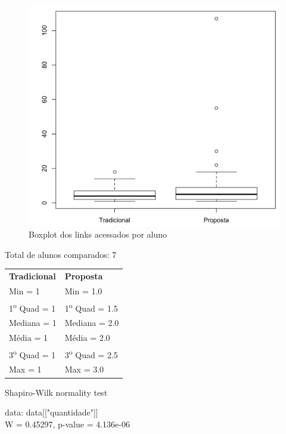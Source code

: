 \begin{figure}[htb]
  \caption{\label{fig:uso-sr-boxplot}Boxplot dos links acessados por aluno}
  \begin{center}
      \includegraphics[scale=0.4]{./Figuras/uso-sr-boxplot.png}
  \end{center}
\end{figure}

\noindent
Total de alunos comparados: 7

\begin{table}[h]
\begin{tabular}{p{}p{}}
\textbf{Tradicional} & \textbf{Proposta}\\
Min = 1 & Min = 1.0\\
1\textsuperscript{o} Quad = 1 & 1\textsuperscript{o} Quad = 1.5\\
Mediana = 1 & Mediana = 2.0\\
Média = 1 & Média = 2.0\\
3\textsuperscript{o} Quad = 1 & 3\textsuperscript{o} Quad = 2.5\\
Max = 1 & Max = 3.0\\
\end{tabular}
\end{table}

  Shapiro-Wilk normality test

\noindent
data:  data[["quantidade"]]\\
W = 0.45297, p-value = 4.136e-06

